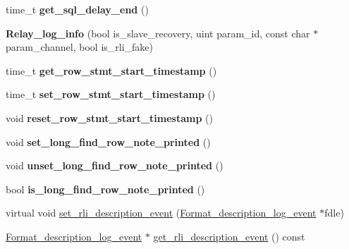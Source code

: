 \begin{DoxyCompactItemize}
time\+\_\+t {\bfseries get\+\_\+sql\+\_\+delay\+\_\+end} ()
\item 
\mbox{\label{classRelay__log__info_ac6c43e06e2e4b2557df2d749498d7da7}} 
{\bfseries Relay\+\_\+log\+\_\+info} (bool is\+\_\+slave\+\_\+recovery, uint param\+\_\+id, const char $\ast$param\+\_\+channel, bool is\+\_\+rli\+\_\+fake)
\item 
\mbox{\label{classRelay__log__info_a8488a40795fa34671aae5ff153c28c12}} 
time\+\_\+t {\bfseries get\+\_\+row\+\_\+stmt\+\_\+start\+\_\+timestamp} ()
\item 
\mbox{\label{classRelay__log__info_a9052e86c77e2e197a9faf2f732aa0c43}} 
time\+\_\+t {\bfseries set\+\_\+row\+\_\+stmt\+\_\+start\+\_\+timestamp} ()
\item 
\mbox{\label{classRelay__log__info_a9b3f88686af3d54e61784a527b0a90d8}} 
void {\bfseries reset\+\_\+row\+\_\+stmt\+\_\+start\+\_\+timestamp} ()
\item 
\mbox{\label{classRelay__log__info_a8328fba71f5d688eac1c9e5f8348cdfe}} 
void {\bfseries set\+\_\+long\+\_\+find\+\_\+row\+\_\+note\+\_\+printed} ()
\item 
\mbox{\label{classRelay__log__info_ad75560075f69e976a2ac82b11eca5149}} 
void {\bfseries unset\+\_\+long\+\_\+find\+\_\+row\+\_\+note\+\_\+printed} ()
\item 
\mbox{\label{classRelay__log__info_a1981ac0f3e9ad05937c6805e8fb34e78}} 
bool {\bfseries is\+\_\+long\+\_\+find\+\_\+row\+\_\+note\+\_\+printed} ()
\item 
virtual void \mbox{\hyperlink{classRelay__log__info_abf39e8666f951158a5dd9c074a2b12d6}{set\+\_\+rli\+\_\+description\+\_\+event}} (\mbox{\hyperlink{classFormat__description__log__event}{Format\+\_\+description\+\_\+log\+\_\+event}} $\ast$fdle)
\item 
\mbox{\hyperlink{classFormat__description__log__event}{Format\+\_\+description\+\_\+log\+\_\+event}} $\ast$ \mbox{\hyperlink{classRelay__log__info_a613b8ded75247b3715590acee3169ef0}{get\+\_\+rli\+\_\+description\+\_\+event}} () const
\item 

\end{DoxyCompactItemize}
